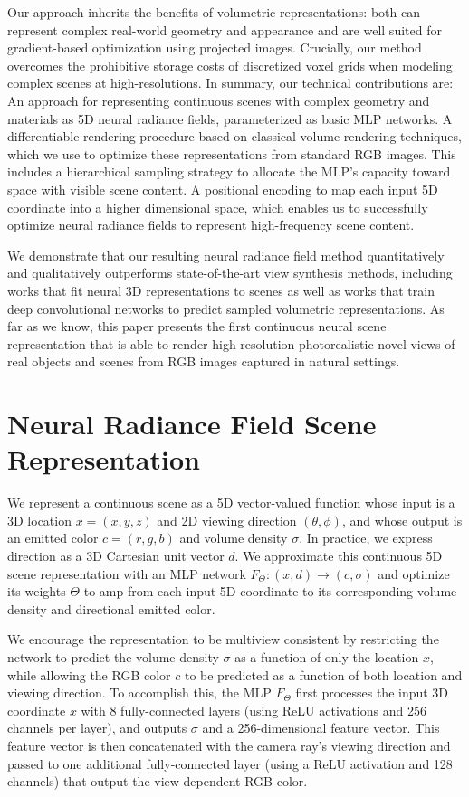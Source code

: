 \documentclass[12pt]{article}
\begin{document}
Our approach inherits the benefits of volumetric representations: both can represent complex real-world geometry
and appearance and are well suited for gradient-based optimization using projected images. Crucially, our method overcomes the prohibitive storage costs of 
discretized voxel grids when modeling complex scenes at high-resolutions. In summary, our technical contributions are: An approach for representing continuous scenes 
with complex geometry and materials as 5D neural radiance fields, parameterized as basic MLP networks.
A differentiable rendering procedure based on classical volume rendering techniques, which we use to optimize these representations from standard RGB images. This includes a hierarchical sampling strategy
to allocate the MLP's capacity toward space with visible scene content. A positional encoding to map each input 5D coordinate into a higher dimensional space,
which enables us to successfully optimize neural radiance fields to represent high-frequency scene content.

We demonstrate that our resulting neural radiance field method quantitatively and qualitatively outperforms state-of-the-art view synthesis methods, 
including works that fit neural 3D representations to scenes as well as works that train deep convolutional networks to predict sampled volumetric representations. 
As far as we know,  this paper presents the first continuous neural scene representation that is able to render high-resolution photorealistic novel views of real objects and scenes from RGB images captured in natural settings. 

\section{Neural Radiance Field Scene Representation}

We represent a continuous scene as a 5D vector-valued function whose input is a 3D location $x=(x,y,z)$ and 2D viewing direction $(\theta, \phi)$,
and whose output is an emitted color $c=(r,g,b)$ and volume density $\sigma$. In practice, we express direction as a 3D Cartesian unit vector $d$. 
We approximate this continuous 5D scene representation with an MLP network $F_{\Theta}: (x,d) \rightarrow (c,\sigma)$ and optimize its weights $\Theta$ to amp from each input 5D coordinate
to its corresponding volume density and directional emitted color.

We encourage the representation to be multiview consistent by restricting the network to predict the volume density $\sigma$ as a function of only the location $x$,
while allowing the RGB color $c$ to be predicted as a function of both location and viewing direction. To accomplish this, the MLP $F_{\Theta}$ first processes the input 3D coordinate $x$ with 8 fully-connected layers (using ReLU activations and 256 channels per layer), 
and outputs $\sigma$ and a 256-dimensional feature vector. This feature vector is then concatenated with the camera ray's viewing direction and passed to one additional fully-connected layer (using a ReLU activation and 128 channels) that output the view-dependent 
RGB color.
\end{document}
